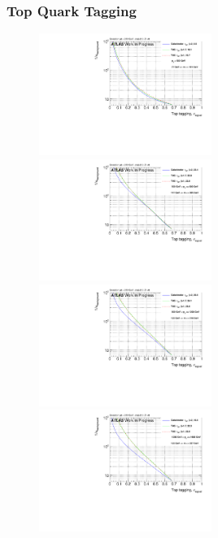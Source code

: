 \subsubsection{Top Quark Tagging}
\begin{figure}[H]
\includegraphics[width=0.5\textwidth]{sascha_input/Appendix/Top_best/ROC_ALL_h_recoJet_nSub32_2_bin1.pdf} \hspace{1mm}
\includegraphics[width=0.5\textwidth]{sascha_input/Appendix/Top_best/ROC_ALL_h_recoJet_nSub32_2_bin2.pdf}
\bigskip
\includegraphics[width=0.5\textwidth]{sascha_input/Appendix/Top_best/ROC_ALL_h_recoJet_nSub32_2_bin3.pdf} \hspace{1mm}
\includegraphics[width=0.5\textwidth]{sascha_input/Appendix/Top_best/ROC_ALL_h_recoJet_nSub32_2_bin4.pdf}

\end{figure}
